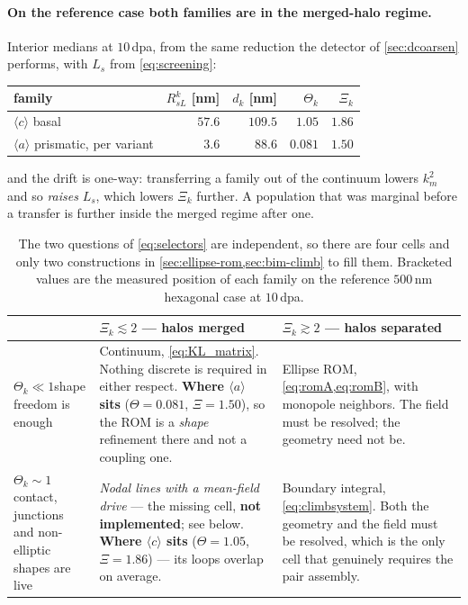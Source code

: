 \documentclass{article}
\newcommand{\aloop}{\ensuremath{\langle a\rangle}}
\newcommand{\cloop}{\ensuremath{\langle c\rangle}}
\begin{document}
\paragraph{On the reference case both families are in the merged-halo regime.}
Interior medians at $10\,$dpa, from the same reduction the detector of
\cref{sec:dcoarsen} performs, with $L_s$ from \cref{eq:screening}:
\begin{center}\small
\begin{tabular}{@{}lrrrr@{}}
\toprule
family & $R^k_{sL}$ [nm] & $d_k$ [nm] & $\Theta_k$ & $\Xi_k$\\
\midrule
\cloop{} basal & $57.6$ & $109.5$ & $1.05$ & $1.86$\\
\aloop{} prismatic, per variant & $3.6$ & $88.6$ & $0.081$ & $1.50$\\
\bottomrule
\end{tabular}
\end{center}
and the drift is one-way: transferring a family out of the continuum lowers
$k^2_m$ and so \emph{raises} $L_s$, which lowers $\Xi_k$ further. A population
that was marginal before a transfer is further inside the merged regime after
one.

\begin{table}[htbp]
\centering
\small
\caption{The two questions of \cref{eq:selectors} are independent, so there are
four cells and only two constructions in \cref{sec:ellipse-rom,sec:bim-climb} to
fill them. Bracketed values are the measured position of each family on the
reference $500$\,nm hexagonal case at $10\,$dpa.}
\label{tab:climb-selection}
\begin{tabularx}{\textwidth}{@{}p{3.0cm} X X@{}}
\toprule
 & $\Xi_k\lesssim2$ --- halos merged & $\Xi_k\gtrsim2$ --- halos separated\\
\midrule
$\Theta_k\ll1$\newline shape freedom is enough &
Continuum, \cref{eq:KL_matrix}. Nothing discrete is required in either respect.
\textbf{Where \aloop{} sits} ($\Theta=0.081$, $\Xi=1.50$), so the ROM is a
\emph{shape} refinement there and not a coupling one. &
Ellipse ROM, \cref{eq:romA,eq:romB}, with monopole neighbors. The field must be
resolved; the geometry need not be. \\
\addlinespace
$\Theta_k\sim1$\newline contact, junctions and non-elliptic shapes are live &
\emph{Nodal lines with a mean-field drive} --- the missing cell,
\textbf{not implemented}; see below. \textbf{Where \cloop{} sits}
($\Theta=1.05$, $\Xi=1.86$) --- its loops overlap on average. &
Boundary integral, \cref{eq:climbsystem}. Both the geometry and the field must be
resolved, which is the only cell that genuinely requires the pair assembly. \\
\bottomrule
\end{tabularx}
\end{table}
\end{document}
